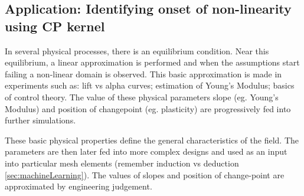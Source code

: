 \subsection{Application: Identifying onset of non-linearity  using CP kernel}\label{subsubsecCh4ApplicationCP}
In several physical processes, there is an equilibrium condition. Near this equilibrium, a linear approximation is performed and when the assumptions start failing a non-linear domain is observed. This basic approximation is made in experiments such as: lift vs alpha curves; estimation of Young's Modulus; basics of control theory. The value of these physical parameters slope (eg. Young's Modulus) and position of changepoint (eg. plasticity) are progressively fed into further simulations. 

These basic physical properties define the general characteristics of the field. The parameters are then later fed into more complex designs and used as an input into particular mesh elements (remember induction vs deduction \ref{sec:machineLearning}). The values of slopes and position of change-point are approximated by engineering judgement. 

\begin{figure}[!ht]
  \centering
    \quad
	    \caption{}
\end{figure}


